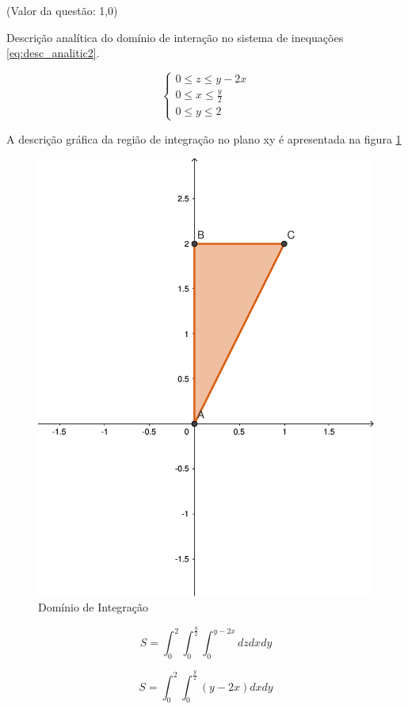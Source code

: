\documentclass[10pt,a4paper]{article}
\begin{document}
	(Valor da questão: 1,0)
	
	Descrição analítica do domínio de interação no sistema de inequações \ref{eq:desc_analitic2}.
	
	\begin{equation} \label{eq:desc_analitic2}
		\left\{
			\begin{array}{l}
				0 \le z \le y - 2x \\
				0 \le x \le \frac{y}{2} \\
				0 \le y \le 2
			\end{array}
		\right.
	\end{equation}
	
	A descrição gráfica da região de integração no plano xy é apresentada na figura \ref{fig:integrais-multiplas-2a}
	
	\begin{figure}[h]
		\centering
		\includegraphics[width=0.7\linewidth]{fig/integrais-multiplas-2a}
		\caption{Domínio de Integração}
		\label{fig:integrais-multiplas-2a}
	\end{figure}
	
	\begin{equation*}
		S = \int_{0}^{2} \int_{0}^{\frac{y}{2}} \int_{0}^{y-2x} dz dx dy
	\end{equation*}
	
	\begin{equation*}
		S = \int_{0}^{2} \int_{0}^{\frac{y}{2}} \left(y-2x \right) dx dy
	\end{equation*}
	
\end{document}
